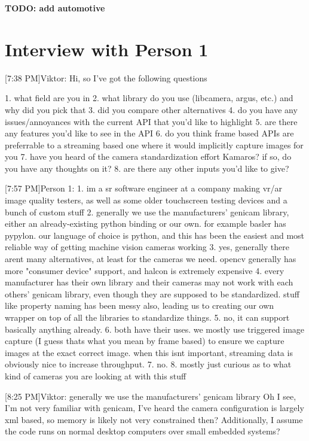 
\textbf{TODO: add automotive}
\section{Interview with Person 1}\label{interview:vrar}
[7:38 PM]Viktor: Hi, so I've got the following questions

1. what field are you in
2. what library do you use (libcamera, argus, etc.) and why did you pick that
3. did you compare other alternatives
4. do you have any issues/annoyances with the current API that you'd like to highlight
5. are there any features you'd like to see in the API
6. do you think frame based APIs are preferrable to a streaming based one where it would implicitly capture images for you
7. have you heard of the camera standardization effort Kamaros? if so, do you have any thoughts on it?
8. are there any other inputs you'd like to give?

[7:57 PM]Person 1:
1. im a sr software engineer at a company making vr/ar image quality testers, as well as some older touchscreen testing devices and a bunch of custom stuff
2. generally we use the manufacturers' genicam library, either an already-existing python binding or our own. for example basler has pypylon. our language of choice is python, and this has been the easiest and most reliable way of getting machine vision cameras working
3. yes, generally there arent many alternatives, at least for the cameras we need. opencv generally has more "consumer device" support, and halcon is extremely expensive
4. every manufacturer has their own library and their cameras may not work with each others' genicam library, even though they are supposed to be standardized. stuff like property naming has been messy also, leading us to creating our own wrapper on top of all the libraries to standardize things.
5. no, it can support basically anything already.
6. both have their uses. we mostly use triggered image capture (I guess thats what you mean by frame based) to ensure we capture images at the exact correct image. when this isnt important, streaming data is obviously nice to increase throughput.
7. no.
8. mostly just curious as to what kind of cameras you are looking at with this stuff

[8:25 PM]Viktor:
generally we use the manufacturers' genicam library
Oh I see, I'm not very familiar with genicam, I've heard the camera configuration is largely xml based, so memory is likely not very constrained then? Additionally, I assume the code runs on normal desktop computers over small embedded systems?

